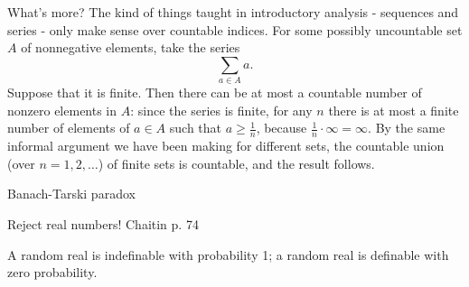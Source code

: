 \documentclass[letterpaper]{article}
\numberwithin{equation}{section}
\begin{document}
What's more? The kind of things taught in introductory analysis - sequences and series - only make sense over countable indices. For some possibly uncountable set $A$ of nonnegative elements, take the series
\[
  \sum_{a\in A}a.
\]
Suppose that it is finite. Then there can be at most a countable number of nonzero elements in $A$: since the series is finite, for any $n$ there is at most a finite number of elements of $a\in A$ such that $a\ge\frac{1}{n}$, because $\frac{1}{n}\cdot\infty=\infty$. By the same informal argument we have been making for different sets, the countable union (over $n=1,2,\dots$) of finite sets is countable, and the result follows.

Banach-Tarski paradox

Reject real numbers! Chaitin p. 74

A random real is indefinable with probability 1; a random real is definable with zero probability.
\end{document}
